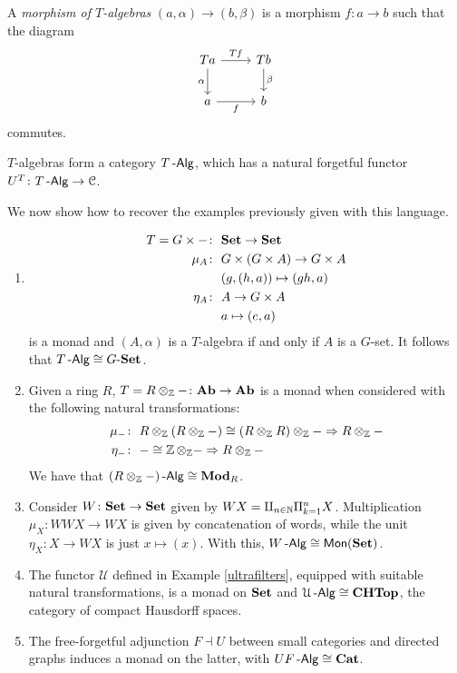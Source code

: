 \documentclass[a4paper,11pt,oneside,openany]{scrbook}
\begin{document}
\begin{defn}
	A \emph{morphism of $T$-algebras} $(a,\alpha)\rightarrow (b,\beta)$ is a morphism $f\colon a\rightarrow b$ such that the diagram
	\[
		\begin{tikzcd}
			Ta\arrow["\alpha"']{d}\arrow["Tf"]{r}
			& Tb\arrow["\beta"]{d} \\
			a\arrow["f"']{r}
			& b
		\end{tikzcd}
	\]
    commutes.
\end{defn}


$T$-algebras form a category $T\operatorname{-\mathsf{Alg}}$, which has a natural forgetful functor $U^T\colon T\operatorname{-\mathsf{Alg}}\rightarrow\operatorname{\mathcal{C}}$.

We now show how to recover the examples previously given with this language.

\begin{exmp}
	\begin{enumerate}
		\item
		      \begin{align*}
			      T=G\times - \colon & \ {\normalfont\textbf{Set}} \rightarrow{\normalfont\textbf{Set}}                      \\
			      \mu_A\colon        & \ G\times (G\times A) \rightarrow G\times A \\
			                         & \ (g,(h,a)) \mapsto (gh,a)                  \\
			      \eta_A\colon       & \ A \rightarrow G\times A                   \\
			                         & \ a \mapsto (e,a)
		      \end{align*}
		      is a monad and $(A,\alpha)$ is a $T$-algebra if and only if $A$ is a $G$-set. It follows that $T\operatorname{-\mathsf{Alg}}\cong G\mbox{-}{\normalfont\textbf{Set}}$.
		\item Given a ring $R$, $T=R\otimes_{\operatorname{\mathbb{Z}}}-\colon {\normalfont\textbf{Ab}}\rightarrow {\normalfont\textbf{Ab}}$ is a monad when considered with the following natural transformations:
		      \begin{align*}
			      \mu_{-}\colon & \ R\otimes_{\Z}(R\otimes_{\Z}-)\cong (R\otimes_{\Z}R)\otimes_{\Z}-\Rightarrow R\otimes_{\Z}- \\
			      \eta_-\colon  & \ -\cong\Z\otimes_{\Z}-\Rightarrow R\otimes_{\Z}-
		      \end{align*}
		      We have that $(R\otimes_{\operatorname{\mathbb{Z}}}-)\operatorname{-\mathsf{Alg}}\cong{\normalfont\textbf{Mod}}_R$.
		\item Consider $W\colon{\normalfont\textbf{Set}}\rightarrow{\normalfont\textbf{Set}}$ given by $WX=\amalg_{n\in\operatorname{\mathbb{N}}}\Pi_{k=1}^n X$. Multiplication $\mu_X\colon WWX\rightarrow WX$ is given by concatenation of words, while the unit $\eta_X\colon X\rightarrow WX$ is just $x\mapsto (x)$. With this, $W\operatorname{-\mathsf{Alg}}\cong \operatorname{\mathsf{Mon}}({\normalfont\textbf{Set}})$.
		\item The functor $\mathcal{U}$ defined in Example \ref{ultrafilters}, equipped with suitable natural transformations, is a monad on ${\normalfont\textbf{Set}}$ and $\mathcal{U}\operatorname{-\mathsf{Alg}}\cong {\normalfont\textbf{CHTop}}$, the category of compact Hausdorff spaces.
		\item The free-forgetful adjunction $F\dashv U$ between small categories and directed graphs induces a monad on the latter, with $UF\operatorname{-\mathsf{Alg}}\cong{\normalfont\textbf{Cat}}$.
	\end{enumerate}
\end{exmp}
\end{document}
